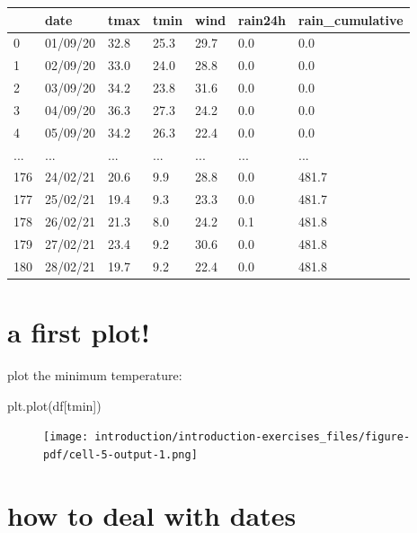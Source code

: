 \documentclass[
  letterpaper,
  DIV=11,
  numbers=noendperiod]{scrreprt}
\newenvironment{Shaded}{\begin{snugshade}}{\end{snugshade}}
\newcommand{\NormalTok}[1]{\textcolor[rgb]{0.00,0.23,0.31}{#1}}
\newcommand{\StringTok}[1]{\textcolor[rgb]{0.13,0.47,0.30}{#1}}
\begin{document}
\begin{longtable}[]{@{}lllllll@{}}
\toprule()
& date & tmax & tmin & wind & rain24h & rain\_cumulative \\
\midrule()
\endhead
0 & 01/09/20 & 32.8 & 25.3 & 29.7 & 0.0 & 0.0 \\
1 & 02/09/20 & 33.0 & 24.0 & 28.8 & 0.0 & 0.0 \\
2 & 03/09/20 & 34.2 & 23.8 & 31.6 & 0.0 & 0.0 \\
3 & 04/09/20 & 36.3 & 27.3 & 24.2 & 0.0 & 0.0 \\
4 & 05/09/20 & 34.2 & 26.3 & 22.4 & 0.0 & 0.0 \\
... & ... & ... & ... & ... & ... & ... \\
176 & 24/02/21 & 20.6 & 9.9 & 28.8 & 0.0 & 481.7 \\
177 & 25/02/21 & 19.4 & 9.3 & 23.3 & 0.0 & 481.7 \\
178 & 26/02/21 & 21.3 & 8.0 & 24.2 & 0.1 & 481.8 \\
179 & 27/02/21 & 23.4 & 9.2 & 30.6 & 0.0 & 481.8 \\
180 & 28/02/21 & 19.7 & 9.2 & 22.4 & 0.0 & 481.8 \\
\bottomrule()
\end{longtable}

\hypertarget{a-first-plot}{%
\section{a first plot!}\label{a-first-plot}}

plot the minimum temperature:

\begin{Shaded}
\begin{Highlighting}[]
\NormalTok{plt.plot(df[}\StringTok{\textquotesingle{}tmin\textquotesingle{}}\NormalTok{])}
\end{Highlighting}
\end{Shaded}

\begin{figure}[H]

{\centering \texttt{[image: introduction/introduction-exercises\_files/figure-pdf/cell-5-output-1.png]}

}

\end{figure}

\hypertarget{how-to-deal-with-dates}{%
\section{how to deal with dates}\label{how-to-deal-with-dates}}
\end{document}
